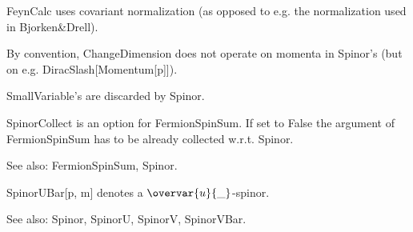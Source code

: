 

FeynCalc uses covariant normalization (as opposed to e.g. the normalization used in Bjorken\&{}Drell).







By convention, ChangeDimension does not operate on momenta in Spinor's (but on e.g. { }DiracSlash[Momentum[p]]).





SmallVariable's are discarded by Spinor.





SpinorCollect is an option for FermionSpinSum. If set to False the { }argument of FermionSpinSum has to be already collected w.r.t.
  Spinor.

See also: { }FermionSpinSum, Spinor.



SpinorUBar[p, m] denotes a \(\overvar{u}{\_}\)-spinor.

See also:  Spinor, SpinorU, SpinorV, SpinorVBar.

